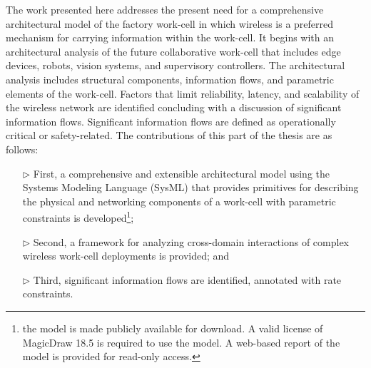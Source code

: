 The work presented here addresses the present need for a comprehensive architectural model of the factory work-cell in which wireless is a preferred mechanism for carrying information within the work-cell. It begins with an architectural analysis of the future collaborative work-cell that includes edge devices, robots, vision systems, and supervisory controllers. The architectural analysis includes structural components, information flows, and parametric elements of the work-cell. Factors that limit reliability, latency, and scalability of the wireless network are identified concluding with a discussion of significant information flows. Significant information flows are defined as operationally critical or safety-related.  The contributions of this part of the thesis are as follows:

\begin{itemize}
	\item[$\rhd$] First, a comprehensive and extensible architectural model using the Systems Modeling Language (SysML) that provides primitives for describing the physical and networking components of a work-cell with parametric constraints is developed\footnote{the model is made publicly available for download. A valid license of MagicDraw 18.5 is required to use the model.  A web-based report of the model is provided for read-only access.};
	\item[$\rhd$] Second, a framework for analyzing cross-domain interactions of complex wireless work-cell deployments is provided; and
	\item[$\rhd$] Third, significant information flows are identified, annotated with rate constraints.
\end{itemize}


